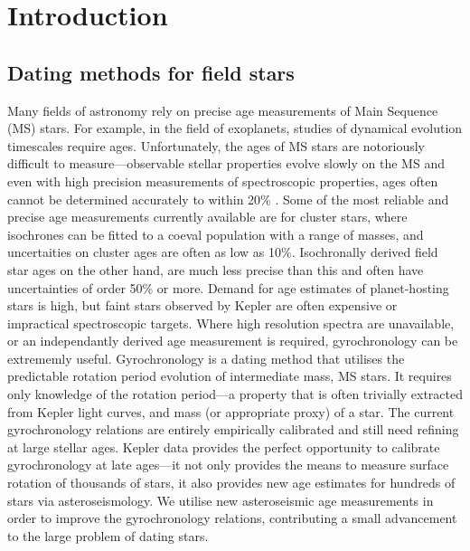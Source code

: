 \documentclass[10pt,preprint]{aastex}
\begin{document}
\section{Introduction}
\label{intro}
\subsection{Dating methods for field stars}

Many fields of astronomy rely on precise age measurements of Main Sequence (MS) stars.
For example, in the field of exoplanets, studies of dynamical evolution timescales require ages.
Unfortunately, the ages of MS stars are notoriously difficult to measure---observable stellar properties evolve slowly on the MS and even with high precision measurements of spectroscopic properties, ages often cannot be determined accurately to within 20\% \citep{Soderblom2010}.
Some of the most reliable and precise age measurements currently available are for cluster stars, where isochrones can be fitted to a coeval population with a range of masses, and uncertaities on cluster ages are often as low as 10\%.
Isochronally derived field star ages on the other hand, are much less precise than this and often have uncertainties of order 50\% or more.
Demand for age estimates of planet-hosting stars is high, but faint stars observed by Kepler are often expensive or impractical spectroscopic targets.
Where high resolution spectra are unavailable, or an independantly derived age measurement is required, gyrochronology can be extrememly useful.
Gyrochronology is a dating method that utilises the predictable rotation period evolution of intermediate mass, MS stars.
It requires only knowledge of the rotation period---a property that is often trivially extracted from Kepler light curves, and mass (or appropriate proxy) of a star.
The current gyrochronology relations are entirely empirically calibrated and still need refining at large stellar ages.
Kepler data provides the perfect opportunity to calibrate gyrochronology at late ages---it not only provides the means to measure surface rotation of thousands of stars, it also provides new age estimates for hundreds of stars via asteroseismology.
We utilise new asteroseismic age measurements in order to improve the gyrochronology relations, contributing a small advancement to the large problem of dating stars.

\end{document}
